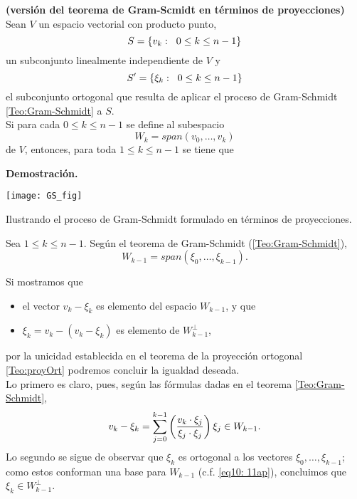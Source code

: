 \begin{prop} \label{Prop:Gram-Schmidt2}
\textbf{(versión del teorema de Gram-Scmidt en términos de
proyecciones)}
Sean $V$ un espacio vectorial con producto punto,
\[
S=\{ v_{k} : \hspace{0.2cm} 0 \leq k \leq n-1 \}
\] un subconjunto
linealmente independiente de $V$ y
\[
S' =\{ \xi_{k} : \hspace{0.2cm} 0 \leq k \leq n-1 \}
\] el subconjunto
ortogonal que resulta de aplicar el proceso de
Gram-Schmidt \ref{Teo:Gram-Schmidt} a $S$. \\

Si para cada $0 \leq k \leq n-1$ se define al subespacio
\[
W_{k}= span(v_{0}, \ldots , v_{k}) 
\]
de $V$, entonces, para toda $1 \leq k \leq n-1$
se tiene que 
\begin{center}
\end{center}
\end{prop}
\noindent
\textbf{Demostración.}

\begin{marginfigure}
\texttt{[image: GS\_fig]} 
		\caption{Ilustrando el proceso de Gram-Schmidt formulado 
		en términos de proyecciones.}
\end{marginfigure}

\noindent
Sea $1 \leq k \leq n-1$.
Según el teorema de Gram-Schmidt (\ref{Teo:Gram-Schmidt}),
\begin{equation}
\label{eq10: 11ap}
W_{k-1}=span(\xi_{0}, \ldots , \xi_{k-1}).
\end{equation}


Si mostramos que
\begin{itemize}
	\item el vector $v_{k}-\xi_{k}$ es elemento
	del espacio $W_{k-1}$, y que
	\item $\xi_{k}=v_{k}-(v_{k}-\xi_{k})$
	es elemento de $W_{k-1}^{\perp}$,
\end{itemize}
por la unicidad establecida en
el teorema de la proyección ortogonal \ref{Teo:proyOrt}
podremos concluir la igualdad deseada. \\
Lo primero es claro, pues, según las fórmulas
dadas en el teorema \ref{Teo:Gram-Schmidt},
\[
v_{k}-\xi_{k}= 
\sum\limits_{j=0}^{k-1}
\left( \frac{v_{k} \cdot \xi_{j}}{\xi_{j} \cdot \xi_{j}} \right) \xi_{j} \in W_{k-1}.
\]
Lo segundo se sigue de observar que
$\xi_{k}$ es ortogonal a los vectores $\xi_{0}, \ldots , \xi_{k-1}$;
como estos conforman una base para $W_{k-1}$
(c.f. \eqref{eq10: 11ap}), concluimos
que $\xi_{k} \in W_{k-1}^{\perp}$.

